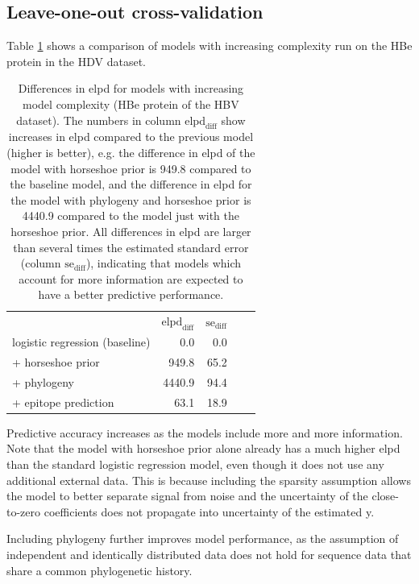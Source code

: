 \documentclass{bioinfo}
\begin{document}
\subsection{Leave-one-out cross-validation}

Table \ref{loo} shows a comparison of models with increasing complexity run on the HBe protein in the HDV dataset.

\begin{table}[h!]
  \renewcommand{\arraystretch}{1.3}
  \centering
  \caption{Differences in elpd for models with increasing model complexity (HBe protein of the HBV dataset).
  The numbers in column \(\text{elpd}_\text{diff}\) show increases in elpd compared to the previous model (higher is better), e.g. the difference in elpd of the model with horseshoe prior is 949.8 compared to the baseline model, and the difference in elpd for the model with phylogeny and horseshoe prior is 4440.9 compared to the model just with the horseshoe prior. All differences in elpd are larger than several times the estimated standard error (column \(\text{se}_\text{diff}\)), indicating that models which account for more information are expected to have a better predictive performance.}
  \vspace{0.5cm}
  \begin{tabular}{l|r|rll}
  \multicolumn{1}{l|}{} & \multicolumn{1}{c|}{\(\text{elpd}_\text{diff}\)} & \multicolumn{1}{c}{\(\text{se}_\text{diff}\)} &  &  \\ \cline{1-3}
  logistic regression (baseline) & 0.0  & 0.0 &  &  \\
  + horseshoe prior     & 949.8  & 65.2 &  &  \\
  + phylogeny & 4440.9 & 94.4 &  &  \\
  + epitope prediction & 63.1   & 18.9 &  & 
  \end{tabular}
  \label{loo}
\end{table}

Predictive accuracy increases as the models include more and more information.
Note that the model with horseshoe prior alone already has a much higher elpd than the standard logistic regression model, even though it does not use any additional external data. This is because including the sparsity assumption allows the model to better separate signal from noise and the uncertainty of the close-to-zero coefficients does not propagate into uncertainty of the estimated y.

Including phylogeny further improves model performance, as the assumption of independent and identically distributed data does not hold for sequence data that share a common phylogenetic history.
\end{document}
